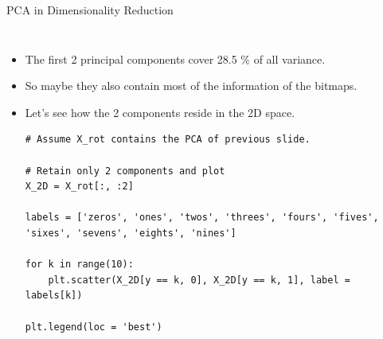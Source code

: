 \documentclass[10pt, aspectratio=169]{beamer} %
\begin{document}
\begin{frame}[fragile, allowframebreaks=0.8]{PCA in Dimensionality Reduction}
		\begin{columns}
	    \begin{itemize}
\item The first 2 principal components cover 28.5 \% of all variance.
\item So maybe they also contain most of the information of the bitmaps.
\item Let's see how the 2 components reside in the 2D space.
\begin{lstlisting}
# Assume X_rot contains the PCA of previous slide.

# Retain only 2 components and plot
X_2D = X_rot[:, :2]

labels = ['zeros', 'ones', 'twos', 'threes', 'fours', 'fives', 'sixes', 'sevens', 'eights', 'nines']

for k in range(10):
    plt.scatter(X_2D[y == k, 0], X_2D[y == k, 1], label = labels[k])

plt.legend(loc = 'best')
\end{lstlisting}

\end{itemize}
			

\end{columns}
\end{frame}
\end{document}
